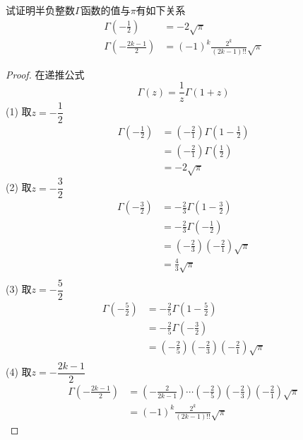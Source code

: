 		\begin{example}
			试证明半负整数$\Gamma$函数的值与$\pi$有如下关系
			\begin{equation}
				\begin{split}
				\Gamma(-\frac{1}{2}) &=-2\sqrt{\pi} \\ 
				\Gamma(-\frac{2k-1}{2}) &=(-1)^k\frac{2^{k}}{(2k-1)!!}\sqrt{\pi}
				\end{split}	
			\end{equation}
			\end{example}
			\begin{proof}
				在递推公式 $$\Gamma(z) = \frac{1}{z}\Gamma(1+z) $$ 
		(1) 取$z=-\dfrac{1}{2}$
		\[
		\begin{aligned}
			 \Gamma(-\frac{1}{2})&= (-\frac{2}{1}) \Gamma(1-\frac{1}{2})\\
			 &=(-\frac{2}{1}) \Gamma(\frac{1}{2})\\
			 &=-2 \sqrt{\pi}
		\end{aligned}	
		\]
		(2) 取$z=-\dfrac{3}{2}$
		\[\begin{aligned}
			\Gamma(-\frac{3}{2})&= -\frac{2}{3} \Gamma(1-\frac{3}{2})\\
			&=-\frac{2}{3} \Gamma(-\frac{1}{2})\\
			&=(-\frac{2}{3})(-\frac{2}{1}) \sqrt{\pi} \\
			&=\frac{4}{3}\sqrt{\pi} \\
	   \end{aligned}\]	
	   (3) 取$z=-\dfrac{5}{2}$
		\[\begin{aligned}
			\Gamma(-\frac{5}{2})&= -\frac{2}{5} \Gamma(1-\frac{5}{2})\\
			&=-\frac{2}{5} \Gamma(-\frac{3}{2})\\
			&=(-\frac{2}{5})(-\frac{2}{3})(-\frac{2}{1}) \sqrt{\pi} \\
	   \end{aligned}\]	
	   (4) 取$z=-\dfrac{2k-1}{2}$
		\[\begin{aligned}
			\Gamma(-\frac{2k-1}{2})
			&=(-\frac{2}{2k-1}) \cdots (-\frac{2}{5})(-\frac{2}{3})(-\frac{2}{1}) \sqrt{\pi} \\
			&= (-1)^k\frac{2^{k}}{(2k-1)!!}\sqrt{\pi} 
	   \end{aligned}\]
		\end{proof}
	
